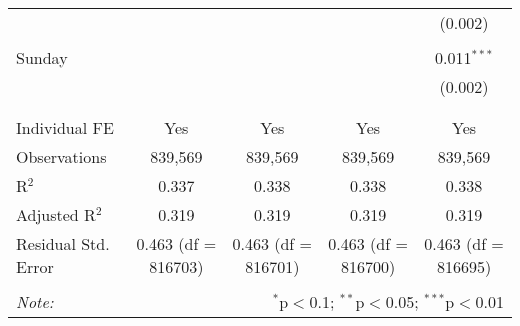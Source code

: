 \documentclass[
]{article}
\begin{document}
\begin{table}[!htbp]
{\begin{tabular}{@{\extracolsep{5pt}}lcccc}
  &  &  &  & (0.002) \\ 
  & & & & \\ 
 Sunday &  &  &  & 0.011$^{***}$ \\ 
  &  &  &  & (0.002) \\ 
  & & & & \\ 
\hline \\[-1.8ex] 
Individual FE & Yes & Yes & Yes & Yes \\ 
Observations & 839,569 & 839,569 & 839,569 & 839,569 \\ 
R$^{2}$ & 0.337 & 0.338 & 0.338 & 0.338 \\ 
Adjusted R$^{2}$ & 0.319 & 0.319 & 0.319 & 0.319 \\ 
Residual Std. Error & 0.463 (df = 816703) & 0.463 (df = 816701) & 0.463 (df = 816700) & 0.463 (df = 816695) \\ 
\hline 
\hline \\[-1.8ex] 
\textit{Note:}  & \multicolumn{4}{r}{$^{*}$p$<$0.1; $^{**}$p$<$0.05; $^{***}$p$<$0.01} \\ 
\end{tabular}
} 
\end{table} 
\newpage
\end{document}

